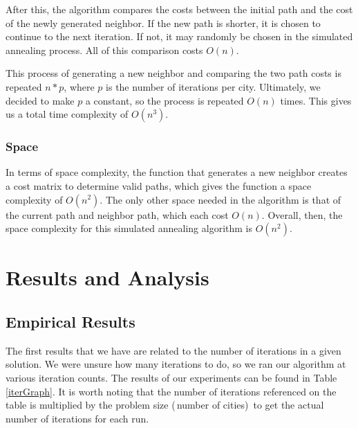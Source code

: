 \documentclass{article}
\def\bigO#1{$O(#1)$}
\begin{document}
\begin{multicols}{2}
        After this, the algorithm compares the costs between the initial path and the cost of the newly generated neighbor. If the new path is shorter, it is chosen to continue to the next iteration. If not, it may randomly be chosen in the simulated annealing process. All of this comparison costs \bigO{n}. 
        
        This process of generating a new neighbor and comparing the two path costs is repeated $n * p$, where $p$ is the number of iterations per city. Ultimately, we decided to make $p$ a constant, so the process is repeated \bigO{n} times. This gives us a total time complexity of \bigO{n^3}.
    
        \subsubsection{Space}

        In terms of space complexity, the function that generates a new neighbor creates a cost matrix to determine valid paths, which gives the function a space complexity of \bigO{n^2}. The only other space needed in the algorithm is that of the current path and neighbor path, which each cost \bigO{n}. Overall, then, the space complexity for this simulated annealing algorithm is \bigO{n^2}.
        
        \section{Results and Analysis}\label{results}
        \subsection{Empirical Results}

        The first results that we have are related to the number of iterations in a given solution. We were unsure how many iterations to do, so we ran our algorithm at various iteration counts. The results of our experiments can be found in Table \ref{iterGraph}. It is worth noting that the number of iterations referenced on the table is multiplied by the problem size (\,number of cities)\, to get the actual number of iterations for each run.
        
    \end{multicols}
\end{document}
